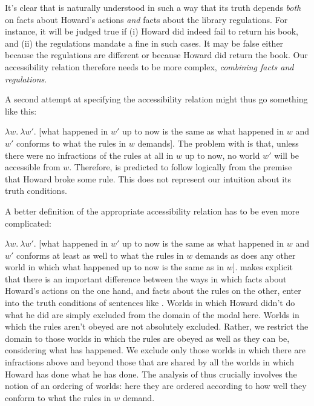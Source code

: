 It's clear that \Last is naturally understood in such a way that its truth
depends \emph{both} on facts about Howard's actions \emph{and} facts about the
library regulations. For instance, it will be judged true if (i) Howard did
indeed fail to return his book, and (ii) the regulations mandate a fine in such
cases. It may be false either because the regulations are different or because
Howard did return the book. Our accessibility relation therefore needs to be
more complex, \emph{combining facts and regulations}.

%
A second attempt at specifying the accessibility relation might thus go
something like this:

\ex $\lambda w.\ \lambda w'.$ [what happened in $w'$ up to now is the same as
what happened in $w$ and $w'$ conforms to what the rules in $w$ demands].\xe
%
The problem with \Last is that, unless there were no infractions of the rules at
all in $w$ up to now, no world $w'$ will be accessible from $w$. Therefore,
\LLast is predicted to follow logically from the premise that Howard broke some
rule. This does not represent our intuition about its truth conditions.

A better definition of the appropriate accessibility relation has to be even
more complicated:

\ex $\lambda w.\ \lambda w'.$ [what happened in $w'$ up to now is the same as
what happened in $w$ and $w'$ conforms at least as well to what the rules in $w$
demands as does any other world in which what happened up to now is the same as
in $w$].\xe
%
\Last makes explicit that there is an important difference between the ways in
which facts about Howard's actions on the one hand, and facts about the rules on
the other, enter into the truth conditions of sentences like .
Worlds in which Howard didn't do what he did are simply excluded from the domain
of the modal here. Worlds in which the rules aren't obeyed are not absolutely
excluded. Rather, we restrict the domain to those worlds in which the rules are
obeyed as well as they can be, considering what has happened. We exclude only
those worlds in which there are infractions above and beyond those that are
shared by all the worlds in which Howard has done what he has done. The analysis
of  thus crucially involves the notion of an ordering of
worlds: here they are ordered according to how well they conform to what the rules
in $w$ demand. 

